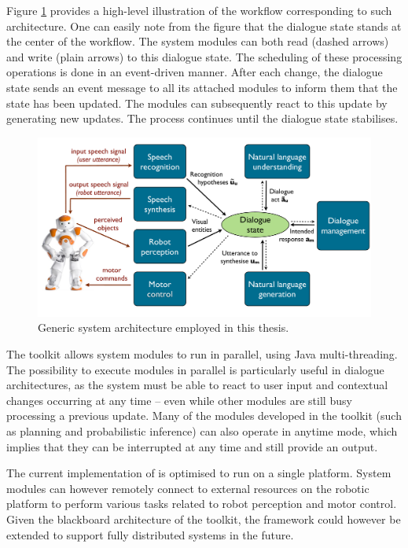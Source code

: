 Figure \ref{fig:impl_architecture} provides a high-level illustration of the workflow corresponding to such architecture. One can easily note from the figure that the dialogue state stands at the center of the workflow. The system modules can both read (dashed arrows) and write (plain arrows) to this dialogue state.  The scheduling of these processing operations is done in an event-driven manner. After each change, the dialogue state sends an event message to all its attached modules to inform them that the state has been updated. The modules can subsequently react to this update by generating new updates.  The process continues until the dialogue state stabilises.  


\begin{figure}[h]
\centering
\includegraphics[scale=0.30]{imgs/impl_architecture.pdf}
\caption{Generic system architecture employed in this thesis.}
\label{fig:impl_architecture}
\end{figure}

The \opendial toolkit allows system modules to run in parallel, using Java multi-threading. The possibility to execute modules in parallel is particularly useful in dialogue architectures, as the system must be able to react to user input and contextual changes occurring at any time -- even while other modules are still busy processing a previous update.  Many of the modules developed in the toolkit (such as planning and probabilistic inference) can also operate in anytime mode, which implies that they can be interrupted at any time and still provide an output. 

The current implementation of \opendial is optimised to run on a single platform.  System modules can however remotely connect to external resources on the robotic platform to perform various tasks related to robot perception and motor control. Given the blackboard architecture of the toolkit, the framework could however be extended to support fully distributed systems in the future.

